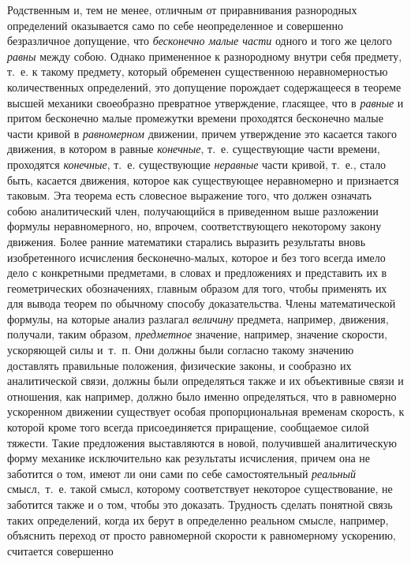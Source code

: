 Родственным и, тем не менее, отличным от приравнивания разнородных
определений оказывается само по себе неопределенное и совершенно
безразличное допущение, что {\em бесконечно малые
части} одного и того же целого {\em равны} между собою.
Однако примененное к разнородному внутри себя предмету, т.~е. к такому
предмету, который обременен существенною неравномерностью количественных
определений, это допущение порождает содержащееся в теореме высшей механики
своеобразно превратное утверждение, гласящее, что в
{\em равные} и притом бесконечно малые промежутки
времени проходятся бесконечно малые части кривой в
{\em равномерном} движении, причем утверждение это
касается такого движения, в котором в равные
{\em конечные}, т.~е. существующие части времени,
проходятся {\em конечные}, т.~е. существующие
{\em неравные} части кривой, т.~е., стало быть,
касается движения, которое как существующее неравномерно и признается
таковым. Эта теорема есть словесное выражение того, что должен означать
собою аналитический член, получающийся в приведенном выше разложении
формулы неравномерного, но, впрочем, соответствующего некоторому закону
движения. Более ранние математики старались выразить результаты вновь
изобретенного исчисления бесконечно-малых, которое и без того всегда имело
дело с конкретными предметами, в словах и предложениях и представить их в
геометрических обозначениях, главным образом для того, чтобы применять их
для вывода теорем по обычному способу доказательства. Члены математической
формулы, на которые анализ разлагал {\em величину}
предмета, например, движения, получали, таким образом,
{\em предметное} значение, например, значение скорости,
ускоряющей силы и~т.~п. Они должны были согласно такому значению доставлять
правильные положения, физические законы, и сообразно их аналитической
связи, должны были определяться также и их объективные связи и отношения,
как например, должно было именно определяться, что в равномерно ускоренном
движении существует особая пропорциональная временам скорость, к которой
кроме того всегда присоединяется приращение, сообщаемое силой тяжести.
Такие предложения выставляются в новой, получившей аналитическую форму
механике исключительно как результаты исчисления, причем она не заботится о
том, имеют ли они сами по себе самостоятельный
{\em реальный} смысл,~т.~е. такой смысл, которому
соответствует некоторое существование, не заботится также и о том, чтобы
это доказать. Трудность сделать понятной связь таких определений, когда их
берут в определенно реальном смысле, например, объяснить переход от просто
равномерной скорости к равномерному ускорению, считается совершенно
